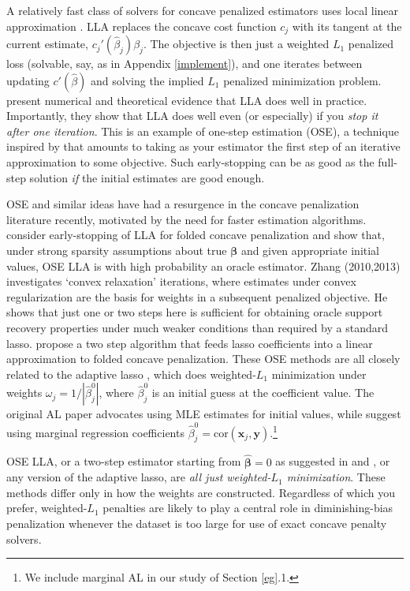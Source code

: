\documentclass[12pt]{article}
\newcommand{\bs}[1]{\boldsymbol{#1}}
\newcommand{\mr}[1]{\mathrm{#1}}
\newcommand{\bm}[1]{\mathbf{#1}}
\begin{document}
A relatively fast class of solvers for concave penalized estimators uses
local linear approximation \cite[LLA; e.g.,][]{candes_enhancing_2008}. LLA
replaces the concave cost function $c_j$  with its tangent at the current
estimate, $c_j'(\hat\beta_j)\beta_j$.  The objective is then just a weighted
$L_1$ penalized loss (solvable, say, as in Appendix \ref{implement}), and one
iterates between updating $c'(\hat\beta)$ and solving the implied $L_1$
penalized minimization problem.  \citet{zou_one-step_2008} present numerical
and theoretical evidence that  LLA does well in practice. Importantly, they
show that LLA does well even (or especially) if you {\it stop it after one
iteration}. This is an example of one-step estimation (OSE), a 
technique inspired by \cite{bickel_one-step_1975} that amounts to taking as
your estimator the first step of an iterative approximation to some objective.
Such early-stopping can be as good  as the full-step solution
{\it if} the initial estimates are good enough. 

OSE and similar ideas have had a resurgence in the concave penalization
literature recently, motivated by the need for faster estimation algorithms.
\cite{fan_strong_2014} consider early-stopping of LLA for folded concave
penalization  and show that, under strong sparsity assumptions about true
$\bs{\beta}$ and given appropriate initial values, OSE LLA is with high
probability an oracle estimator.   Zhang (2010,2013)
\nocite{zhang_analysis_2010,zhang_multi-stage_2013} investigates  
`convex relaxation' iterations, where estimates under convex regularization
 are the basis for weights in a subsequent penalized objective.  He shows that
 just one or two steps here is sufficient for obtaining oracle support
 recovery properties under much weaker conditions than required by a standard
 lasso.  \cite{wang_calibrating_2013} propose a two step algorithm that feeds
 lasso coefficients into a linear approximation to folded concave
 penalization.  These OSE methods are all closely related to  the adaptive lasso
\citep[AL;][]{zou_adaptive_2006}, which does weighted-$L_1$ minimization under
weights $\omega_j = 1/|\hat\beta^0_j|$, where $\hat\beta^0_j$ is an initial
guess at the coefficient value.  The original AL paper advocates using MLE
estimates for initial values, while
\cite{huang_adaptive_2008} suggest using marginal regression coefficients
$\hat\beta^0_j = \mr{cor}(\bm{x}_j,\bm{y})$.\footnote{We include marginal AL in our study
of Section \ref{eg}.1.}

OSE LLA, or a two-step estimator starting from
$\bs{\hat\beta}=0$ as suggested in \cite{fan_strong_2014} and
\cite{wang_calibrating_2013}, or any version of the adaptive lasso, are {\it all just weighted-$L_1$
minimization}. These methods differ only in how the
weights are constructed.  Regardless of which you prefer, weighted-$L_1$
penalties are likely to play a central role in diminishing-bias penalization
whenever the dataset is too large for use of exact concave penalty solvers.
\end{document}
